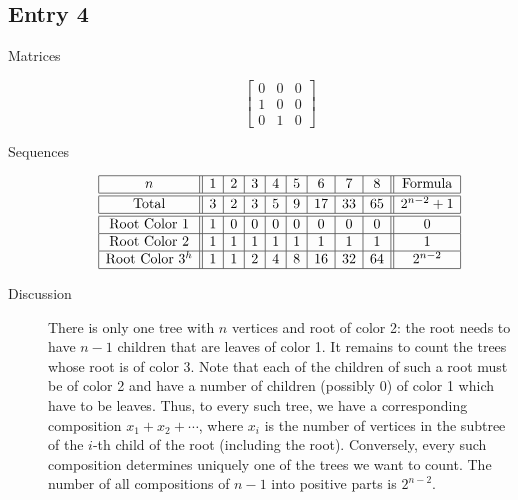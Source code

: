 \documentclass[12pt]{amsart}
\begin{document}
\subsection*{Entry 4}
\begin{description}
    \item[Matrices]
    
    \[\begin{bmatrix}
0 & 0 & 0 \\
1 & 0 & 0 \\
0 & 1 & 0
\end{bmatrix}\]
    \item[Sequences]\hspace*{\fill}\vspace{-0.5cm}
    \begin{center}
        \[
        \begin{array}{|c||c|c|c|c|c|c|c|c||c|}\hline
           n  & 1 & 2 & 3 & 4 & 5 & 6 & 7 & 8  & \text{Formula}\\\hline\hline
           \text{Total}  & 3 & 2 & 3 & 5 & 9 & 17 & 33 & 65 & 2^{n-2}+1\\\hline\hline
           \text{Root Color }1 & 1 & 0 & 0 & 0 & 0 & 0 & 0 & 0 & 0\\\hline
           \text{Root Color }2 & 1 & 1 & 1 & 1 & 1 & 1 & 1 & 1 & 1\\\hline
           \text{Root Color }3^h & 1 & 1 & 2 & 4 & 8 & 16 & 32 & 64 & 2^{n-2}\\\hline
        \end{array}
        \]
    \end{center}
    

    \item[Discussion] There is only one tree with $n$ vertices and root of color 2: the root needs to have $n-1$ children that are leaves of color 1. It remains to count the trees whose root is of color 3. Note that each of the children of such a root must be of color 2 and have a number of children (possibly $0$) of color 1 which have to be leaves. Thus, to every such tree, we have a corresponding composition $x_{1} + x_{2}+ \cdots $, where $x_i$ is the number of vertices in the subtree of the $i$-th child of the root (including the root). Conversely, every such composition determines uniquely one of the trees we want to count. The number of all compositions of $n-1$ into positive parts is $2^{n-2}$.
\end{description}
\end{document}
